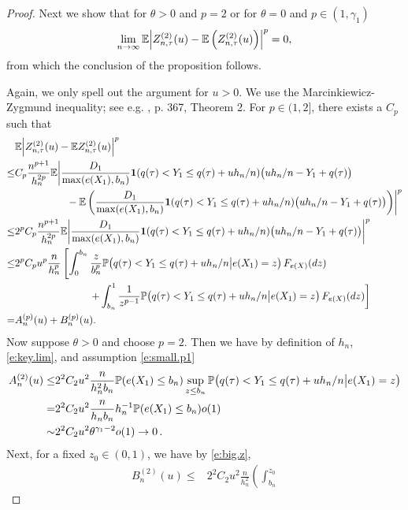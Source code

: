 \documentclass[12pt]{amsart}
\newcommand{\LFe}{F_{e(X)}}
\newcommand{\1}{\mathbbm{1}}
\newcommand{\0}{\mathbf{0}}
\newcommand{\one}{\mathbf{1}}
\newcommand{\E}{\mathbb{E}}
\theoremstyle{plain}
\theoremstyle{definition}
\newcommand{\bbP}{\mathbb{P}}
\begin{document}
\begin{proof}
Next we show that for $\theta>0$ and $p=2$ or for $\theta=0$ and $p\in (1,\gamma_1)$
\begin{equation} \label{e:lim.var}
\lim_{n\to\infty}\E\Bigl|Z^{(2)}_{n,\tau}(u)-\E\left(Z^{(2)}_{n,\tau}(u)\right)\Bigr|^p =0,
\end{equation}
from which the conclusion of the proposition follows.
% 

Again, we only spell out the argument for $u>0$.   We use the Marcinkiewicz-Zygmund inequality; see e.g. \cite{chow:teicher:1988}, p. 367, Theorem 2. 
For  $p\in(1,2]$, there exists a $C_p$ such that
\begin{align*}
  &\E\Bigl|Z^{(2)}_{n,\tau}(u) -\E Z^{(2)}_{n,\tau}(u)\Bigr|^p\\
\leq& C_p\frac{n^{p+1}}{h_n^{2p}}\E\biggl|  \frac{D_1}{\max(e(X_1),b_n)} \one
  (q(\tau)<Y_1\leq q(\tau)+uh_n/n) \bigl(
  uh_n/n-Y_1+q(\tau)\bigr)\\
  &\hskip 0.7in  -\E\left( \frac{D_1}{\max(e(X_1),b_n)} \one
  (q(\tau)<Y_1\leq q(\tau)+uh_n/n) \bigl(
  uh_n/n-Y_1+q(\tau)\bigr)\right)
  \biggr|^p\\
\leq & 2^p C_p\frac{n^{p+1}}{h_n^{2p}}\E\biggl|  \frac{D_1}{\max(e(X_1),b_n)} \one
  (q(\tau)<Y_1\leq q(\tau)+uh_n/n) \bigl(
  uh_n/n-Y_1+q(\tau)\bigr)\biggr|^p\\
 \leq& 2^p C_p u^p\frac{n}{h_n^p}\left[       \int_0^{b_n} \frac{z}{b_n^p} \bbP
  \bigl(q(\tau)<Y_1\leq q(\tau)+uh_n/n  
   \big| e(X_1)=z\bigr)\, \LFe(dz)  \right. \\
   & \left.  \hskip 1in + \int_{b_n}^1    \frac{1}{z^{p-1}} \bbP
  \bigl(q(\tau)<Y_1\leq q(\tau)+uh_n/n  
   \big| e(X_1)=z\bigr)\, \LFe(dz) 
\right]\\
 = & A^{(p)}_n(u) +B^{(p)}_n(u). 
\end{align*}
Now suppose $\theta>0$ and choose $p=2$.  Then we have by definition of $h_n$, \eqref{e:key.lim}, and assumption \eqref{e:small.p1}
%
\begin{align} 
\notag A^{(2)}_n(u) \leq  & 2^2 C_2 u^2\frac{n}{h_n^2b_n} \bbP(e(X_1)\leq  b_n)\sup_{z\le b_n}\bbP
  \bigl(q(\tau)<Y_1\leq q(\tau)+uh_n/n  
   \big| e(X_1)=z\bigr)\\
\notag =& 2^2 C_2 u^2\frac{n}{h_nb_n} h_n^{-1} \bbP(e(X_1)\leq  b_n) o(1)\\
\notag \sim& 2^2 C_2 u^2\theta^{\gamma_1-2}o(1) 
   \to   0\,.
\end{align}
Next, for a fixed $z_0\in (0,1)$, we have by \eqref{e:big.z}, 
%
\begin{align*} 
B^{(2)}_n(u) \leq& 2^2 C_2 u^2\frac{n}{h_n^2} \left(\int_{b_n}^{z_0}

\end{align*}
\end{proof}
\end{document}
